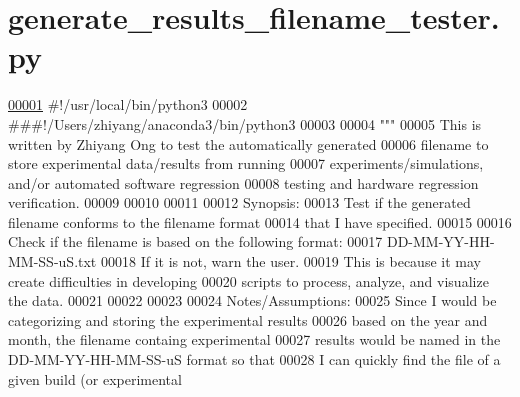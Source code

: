 \hypertarget{generate__results__filename__tester_8py_source}{}\section{generate\+\_\+results\+\_\+filename\+\_\+tester.\+py}
\label{generate__results__filename__tester_8py_source}

\begin{DoxyCode}
\hypertarget{generate__results__filename__tester_8py_source_l00001}{}\hyperlink{namespaceutilities_1_1generate__results__filename__tester}{00001} \textcolor{comment}{#!/usr/local/bin/python3}
00002 \textcolor{comment}{###!/Users/zhiyang/anaconda3/bin/python3}
00003 
00004 \textcolor{stringliteral}{"""}
00005 \textcolor{stringliteral}{    This is written by Zhiyang Ong to test the automatically generated}
00006 \textcolor{stringliteral}{        filename to store experimental data/results from running}
00007 \textcolor{stringliteral}{        experiments/simulations, and/or automated software regression}
00008 \textcolor{stringliteral}{        testing and hardware regression verification.}
00009 \textcolor{stringliteral}{}
00010 \textcolor{stringliteral}{}
00011 \textcolor{stringliteral}{}
00012 \textcolor{stringliteral}{    Synopsis:}
00013 \textcolor{stringliteral}{    Test if the generated filename conforms to the filename format}
00014 \textcolor{stringliteral}{        that I have specified.}
00015 \textcolor{stringliteral}{}
00016 \textcolor{stringliteral}{    Check if the filename is based on the following format:}
00017 \textcolor{stringliteral}{        DD-MM-YY-HH-MM-SS-uS.txt}
00018 \textcolor{stringliteral}{    If it is not, warn the user.}
00019 \textcolor{stringliteral}{        This is because it may create difficulties in developing}
00020 \textcolor{stringliteral}{            scripts to process, analyze, and visualize the data.}
00021 \textcolor{stringliteral}{}
00022 \textcolor{stringliteral}{}
00023 \textcolor{stringliteral}{}
00024 \textcolor{stringliteral}{    Notes/Assumptions:}
00025 \textcolor{stringliteral}{    Since I would be categorizing and storing the experimental results}
00026 \textcolor{stringliteral}{        based on the year and month, the filename containg experimental}
00027 \textcolor{stringliteral}{        results would be named in the DD-MM-YY-HH-MM-SS-uS format so that}
00028 \textcolor{stringliteral}{        I can quickly find the file of a given build (or experimental}

\end{DoxyCode}
